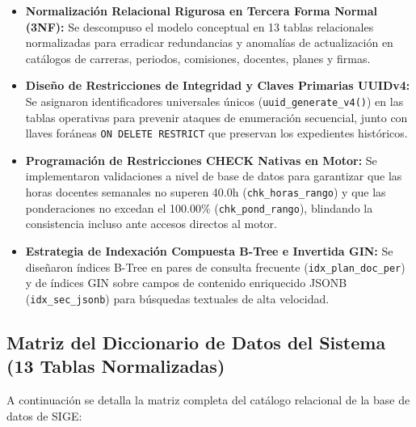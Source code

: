 \documentclass[12pt,a4paper]{article}
\begin{document}
\begin{itemize}[leftmargin=1.5em, itemsep=4pt]
    \item \textbf{Normalización Relacional Rigurosa en Tercera Forma Normal (3NF):} Se descompuso el modelo conceptual en 13 tablas relacionales normalizadas para erradicar redundancias y anomalías de actualización en catálogos de carreras, periodos, comisiones, docentes, planes y firmas.
    \item \textbf{Diseño de Restricciones de Integridad y Claves Primarias UUIDv4:} Se asignaron identificadores universales únicos (\texttt{uuid\_\allowbreak  generate\_\allowbreak  v4()}) en las tablas operativas para prevenir ataques de enumeración secuencial, junto con llaves foráneas \texttt{ON DELETE RESTRICT} que preservan los expedientes históricos.
    \item \textbf{Programación de Restricciones CHECK Nativas en Motor:} Se implementaron validaciones a nivel de base de datos para garantizar que las horas docentes semanales no superen 40.0h (\texttt{chk\_\allowbreak  horas\_\allowbreak  rango}) y que las ponderaciones no excedan el 100.00\% (\texttt{chk\_\allowbreak  pond\_\allowbreak  rango}), blindando la consistencia incluso ante accesos directos al motor.
    \item \textbf{Estrategia de Indexación Compuesta B-Tree e Invertida GIN:} Se diseñaron índices B-Tree en pares de consulta frecuente (\texttt{idx\_\allowbreak  plan\_\allowbreak  doc\_\allowbreak  per}) y de índices GIN sobre campos de contenido enriquecido JSONB (\texttt{idx\_\allowbreak  sec\_\allowbreak  jsonb}) para búsquedas textuales de alta velocidad.
\end{itemize}

\subsection{Matriz del Diccionario de Datos del Sistema (13 Tablas Normalizadas)}
A continuación se detalla la matriz completa del catálogo relacional de la base de datos de SIGE:
\end{document}
